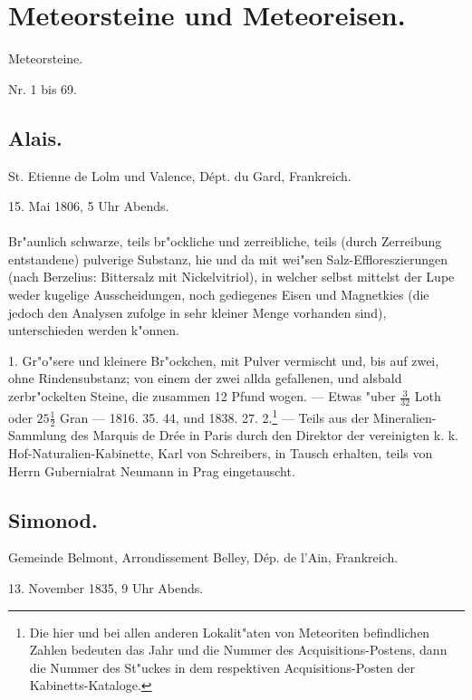 \documentclass[a4paper, 11pt, oneside, polutonikogreek, german]{article}
\begin{document}
\section{Meteorsteine und Meteoreisen.}
\begin{center}
{\LARGE Meteorsteine.}

Nr. 1 bis 69.
\end{center}
\subsection{Alais.}
\begin{center}
\small
St. Etienne de Lolm und Valence, Dépt. du Gard, Frankreich.

15. Mai 1806, 5 Uhr Abends.
\end{center}
\paragraph{}
Br"aunlich schwarze, teils br"ockliche und zerreibliche, teils (durch Zerreibung entstandene) pulverige Substanz, hie und da mit wei"sen Salz-Effloreszierungen (nach Berzelius: Bittersalz mit Nickelvitriol), in welcher selbst mittelst der Lupe weder kugelige Ausscheidungen, noch gediegenes Eisen und Magnetkies (die jedoch den Analysen zufolge in sehr kleiner Menge vorhanden sind), unterschieden werden k"onnen.

1. Gr"o"sere und kleinere Br"ockchen, mit Pulver vermischt und, bis auf zwei, ohne Rindensubstanz; von einem der zwei allda gefallenen, und alsbald zerbr"ockelten Steine, die zusammen 12 Pfund wogen. --- Etwas "uber $\frac{3}{32}$ Loth oder $25\frac{1}{2}$ Gran --- 1816. 35. 44, und 1838. 27. 2.\footnote{Die hier und bei allen anderen Lokalit"aten von Meteoriten befindlichen Zahlen bedeuten das Jahr und die Nummer des Acquisitions-Postens, dann die Nummer des St"uckes in dem respektiven Acquisitions-Posten der Kabinetts-Kataloge.} --- Teils aus der Mineralien-Sammlung des Marquis de Drée in Paris durch den Direktor der vereinigten k. k. Hof-Naturalien-Kabinette, Karl von Schreibers, in Tausch erhalten, teils von Herrn Gubernialrat Neumann in Prag eingetauscht.
\subsection{Simonod.}
\begin{center}
\small
Gemeinde Belmont, Arrondissement Belley, Dép. de l’Ain, Frankreich.

13. November 1835, 9 Uhr Abends.
\end{center}
\end{document}
